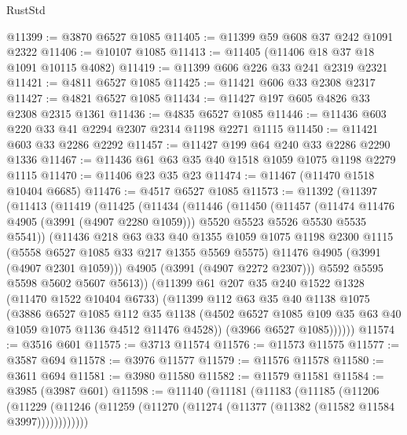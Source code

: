 \begin{lexlean}{RustStd}
\begin{coremodule}
@11399 := @3870 @6527 @1085
@11405 := @11399 @59 @608 @37 @242 @1091 @2322
@11406 := @10107 @1085
@11413 := @11405 (@11406 @18 @37 @18 @1091 @10115 @4082)
@11419 := @11399 @606 @226 @33 @241 @2319 @2321
@11421 := @4811 @6527 @1085
@11425 := @11421 @606 @33 @2308 @2317
@11427 := @4821 @6527 @1085
@11434 := @11427 @197 @605 @4826 @33 @2308 @2315 @1361
@11436 := @4835 @6527 @1085
@11446 := @11436 @603 @220 @33 @41 @2294 @2307 @2314 @1198 @2271 @1115
@11450 := @11421 @603 @33 @2286 @2292
@11457 := @11427 @199 @64 @240 @33 @2286 @2290 @1336
@11467 := @11436 @61 @63 @35 @40 @1518 @1059 @1075 @1198 @2279 @1115
@11470 := @11406 @23 @35 @23
@11474 := @11467 (@11470 @1518 @10404 @6685)
@11476 := @4517 @6527 @1085
@11573 := @11392
    (@11397
      (@11413
        (@11419
          (@11425
            (@11434
              (@11446
                (@11450
                  (@11457
                    (@11474 @11476 @4905 (@3991 (@4907 @2280 @1059)))
                    @5520
                    @5523
                    @5526
                    @5530
                    @5535
                    @5541))
                (@11436
                  @218
                  @63
                  @33
                  @40
                  @1355
                  @1059
                  @1075
                  @1198
                  @2300
                  @1115
                  (@5558 @6527 @1085 @33 @217 @1355 @5569 @5575)
                  @11476
                  @4905
                  (@3991 (@4907 @2301 @1059)))
                @4905
                (@3991 (@4907 @2272 @2307)))
              @5592
              @5595
              @5598
              @5602
              @5607
              @5613))
          (@11399
            @61
            @207
            @35
            @240
            @1522
            @1328
            (@11470 @1522 @10404 @6733)
            (@11399
              @112
              @63
              @35
              @40
              @1138
              @1075
              (@3886
                @6527
                @1085
                @112
                @35
                @1138
                (@4502 @6527 @1085 @109 @35 @63 @40 @1059 @1075 @1136 @4512 @11476 @4528))
              (@3966 @6527 @1085))))))
@11574 := @3516 @601
@11575 := @3713 @11574
@11576 := @11573 @11575
@11577 := @3587 @694
@11578 := @3976 @11577
@11579 := @11576 @11578
@11580 := @3611 @694
@11581 := @3980 @11580
@11582 := @11579 @11581
@11584 := @3985 (@3987 @601)
@11598 := @11140
    (@11181
      (@11183
        (@11185
          (@11206
            (@11229 (@11246 (@11259 (@11270 (@11274 (@11377 (@11382 (@11582 @11584 @3997))))))))))))

\end{coremodule}
\end{lexlean}
